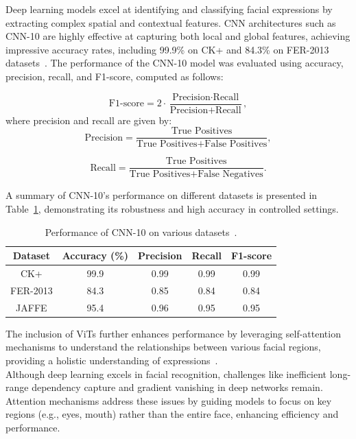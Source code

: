 \documentclass[lettersize,journal]{IEEEtran}
\begin{document}
Deep learning models excel at identifying and classifying facial expressions by extracting complex spatial and contextual features. CNN architectures such as CNN-10 are highly effective at capturing both local and global features, achieving impressive accuracy rates, including 99.9\% on CK+ and 84.3\% on FER-2013 datasets~\cite{Dada2023}. The performance of the CNN-10 model was evaluated using accuracy, precision, recall, and F1-score, computed as follows:

\begin{equation}
\text{F1-score} = 2 \cdot \frac{\text{Precision} \cdot \text{Recall}}{\text{Precision} + \text{Recall}},
\label{eq:f1_score}
\end{equation}
where precision and recall are given by:
\begin{equation}
\text{Precision} = \frac{\text{True Positives}}
{\text{True Positives} + \text{False Positives}},
\label{eq:precision}
\end{equation}

\begin{equation}
\text{Recall} = \frac{\text{True Positives}}
{\text{True Positives} + \text{False Negatives}}.
\label{eq:recall}
\end{equation}

A summary of CNN-10's performance on different datasets is presented in Table~\ref{tab:cnn10_performance}, demonstrating its robustness and high accuracy in controlled settings.

\begin{table}[h!]
\centering
\caption{Performance of CNN-10 on various datasets~\cite{Dada2023}.}
\label{tab:cnn10_performance}
\begin{tabular}{|c|c|c|c|c|}
\hline
\textbf{Dataset} & \textbf{Accuracy (\%)} & \textbf{Precision} & \textbf{Recall} & \textbf{F1-score} \\ \hline
CK+              & 99.9                  & 0.99              & 0.99            & 0.99              \\ \hline
FER-2013         & 84.3                  & 0.85              & 0.84            & 0.84              \\ \hline
JAFFE            & 95.4                  & 0.96              & 0.95            & 0.95              \\ \hline
\end{tabular}
\end{table}

The inclusion of ViTs further enhances performance by leveraging self-attention mechanisms to understand the relationships between various facial regions, providing a holistic understanding of expressions~\cite{Dada2023}.\\
Although deep learning excels in facial recognition, challenges like inefficient long-range dependency capture and gradient vanishing in deep networks remain. Attention mechanisms address these issues by guiding models to focus on key regions (e.g., eyes, mouth) rather than the entire face, enhancing efficiency and performance.
\end{document}
